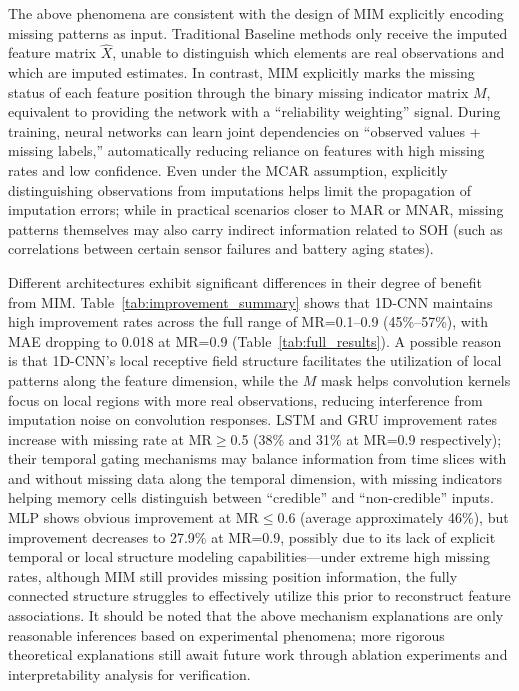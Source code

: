 \documentclass[10pt,a4paper]{article}
\begin{document}
The above phenomena are consistent with the design of MIM explicitly encoding missing patterns as input. Traditional Baseline methods only receive the imputed feature matrix $\hat{X}$, unable to distinguish which elements are real observations and which are imputed estimates. In contrast, MIM explicitly marks the missing status of each feature position through the binary missing indicator matrix $M$, equivalent to providing the network with a ``reliability weighting'' signal. During training, neural networks can learn joint dependencies on ``observed values + missing labels,'' automatically reducing reliance on features with high missing rates and low confidence. Even under the MCAR assumption, explicitly distinguishing observations from imputations helps limit the propagation of imputation errors; while in practical scenarios closer to MAR or MNAR, missing patterns themselves may also carry indirect information related to SOH (such as correlations between certain sensor failures and battery aging states).

Different architectures exhibit significant differences in their degree of benefit from MIM. Table~\ref{tab:improvement_summary} shows that 1D-CNN maintains high improvement rates across the full range of MR=0.1--0.9 (45\%--57\%), with MAE dropping to 0.018 at MR=0.9 (Table~\ref{tab:full_results}). A possible reason is that 1D-CNN's local receptive field structure facilitates the utilization of local patterns along the feature dimension, while the $M$ mask helps convolution kernels focus on local regions with more real observations, reducing interference from imputation noise on convolution responses. LSTM and GRU improvement rates increase with missing rate at MR$\geq$0.5 (38\% and 31\% at MR=0.9 respectively); their temporal gating mechanisms may balance information from time slices with and without missing data along the temporal dimension, with missing indicators helping memory cells distinguish between ``credible'' and ``non-credible'' inputs. MLP shows obvious improvement at MR$\leq$0.6 (average approximately 46\%), but improvement decreases to 27.9\% at MR=0.9, possibly due to its lack of explicit temporal or local structure modeling capabilities---under extreme high missing rates, although MIM still provides missing position information, the fully connected structure struggles to effectively utilize this prior to reconstruct feature associations. It should be noted that the above mechanism explanations are only reasonable inferences based on experimental phenomena; more rigorous theoretical explanations still await future work through ablation experiments and interpretability analysis for verification.
\end{document}
